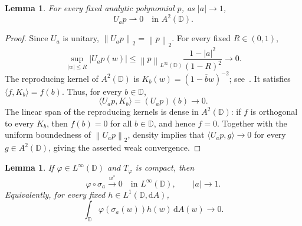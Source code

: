 \documentclass[12pt,a4paper]{article}
\newtheorem{lemma}[theorem]{Lemma}
\theoremstyle{remark}
\newcommand{\D}{\mathbb D}
\newcommand{\dA}{\,\mathrm dA}
\newcommand{\A}{A^2(\D)}
\newcommand{\norm}[1]{\left\lVert#1\right\rVert}
\begin{document}
\begin{lemma}\label{lem:weak}
For every fixed analytic polynomial $p$, as $|a|\to1$,
\[
U_ap\rightharpoonup0\quad\text{in }\A.
\]
\end{lemma}
\begin{proof}
Since $U_a$ is unitary, $\norm{U_ap}_2=\norm p_2$. For every fixed $R\in(0,1)$,
\[
\sup_{|w|\le R}|U_ap(w)|
\le\norm p_{L^\infty(\D)}\frac{1-|a|^2}{(1-R)^2}\longrightarrow0.
\]
The reproducing kernel of $\A$ is $K_b(w)=(1-\overline b w)^{-2}$; see~\cite[Chapter~1]{HKZ2000}. It satisfies
$\langle f,K_b\rangle=f(b)$. Thus, for every $b\in\D$,
\[
\langle U_ap,K_b\rangle=(U_ap)(b)\longrightarrow0.
\]
The linear span of the reproducing kernels is dense in $\A$: if $f$ is orthogonal to every $K_b$,
then $f(b)=0$ for all $b\in\D$, and hence $f=0$.
Together with the uniform boundedness of $\norm{U_ap}_2$, density implies that $\langle U_ap,g\rangle\to0$ for every $g\in\A$, giving the asserted weak convergence.

\end{proof}
\begin{lemma}\label{lem:weakstar}
If $\varphi\in L^\infty(\D)$ and $T_\varphi$ is compact, then
\begin{equation}\label{eq:weakstar}
\varphi\circ\sigma_a\overset{w^*}{\longrightarrow}0
\quad\text{in }L^\infty(\D),\qquad |a|\to1.
\end{equation}
Equivalently, for every fixed $h\in L^1(\D,\mathrm dA)$,
\begin{equation}\label{eq:test}
\int_\D\varphi(\sigma_a(w))h(w)\dA(w)\longrightarrow0.
\end{equation}
\end{lemma}
\end{document}
